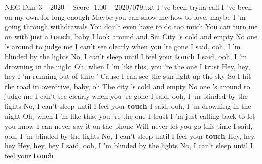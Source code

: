 \begin{textsample}{NEG Dim 3 – 2020 – Score -1.00 – 2020/079.txt}  \label{ex:f3_neg_040}
I 've been tryna call I 've been on my own for long enough Maybe you can show me how to love, maybe I 'm going through withdrawals You don't even have to do too much You can turn me on with just a \textbf{touch}, baby I look around and Sin City 's cold and empty No one 's around to judge me I can't see clearly when you 're gone I said, ooh, I 'm blinded by the lights No, I can't sleep until I feel your \textbf{touch} I said, ooh, I 'm drowning in the night Oh, when I 'm like this, you 're the one I trust Hey, hey, hey I 'm running out of time ' Cause I can see the sun light up the sky So I hit the road in overdrive, baby, oh The city 's cold and empty No one 's around to judge me I can't see clearly when you 're gone I said, ooh, I 'm blinded by the lights No, I can't sleep until I feel your \textbf{touch} I said, ooh, I 'm drowning in the night Oh, when I 'm like this, you 're the one I trust I 'm just calling back to let you know I can never say it on the phone Will never let you go this time I said, ooh, I 'm blinded by the lights No, I can't sleep until I feel your \textbf{touch} Hey, hey, hey Hey, hey, hey I said, ooh, I 'm blinded by the lights No, I can't sleep until I feel your \textbf{touch}

\end{textsample}
